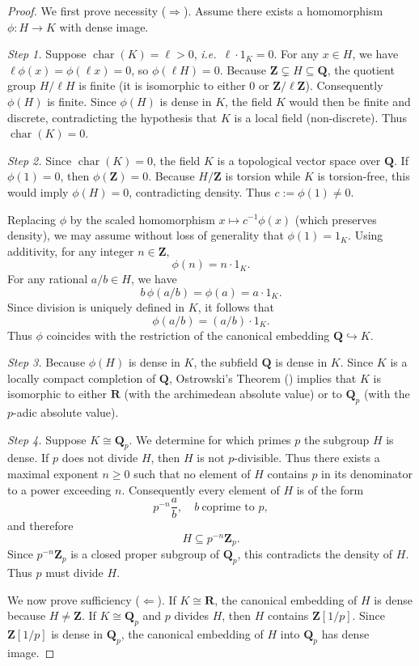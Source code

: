 \documentclass[11pt,a4paper]{article}
\newcommand{\Q}{\mathbf{Q}}
\newcommand{\R}{\mathbf{R}}
\newcommand{\Z}{\mathbf{Z}}
\def\ie{{\it i.e.\/}\ }
\begin{document}
\begin{proof}
We first prove necessity ($\Rightarrow$). 
Assume there exists a homomorphism 
$\phi: H \to K$ with dense image.

\emph{Step 1.}
Suppose $\operatorname{char}(K) = \ell > 0$, 
\ie $\ell\cdot 1_K = 0$. 
For any $x \in H$, we have
$\ell\phi(x)=\phi(\ell x)=0$, 
so $\phi(\ell H)=0$. 
Because $\Z\subsetneq H\subseteq\Q$, 
the quotient group $H/\ell H$ is finite 
(it is isomorphic to either $0$ or $\Z/\ell\Z$). 
Consequently $\phi(H)$ is finite. 
Since $\phi(H)$ is dense in $K$, 
the field $K$ would then be finite and discrete, 
contradicting the hypothesis that $K$ is a 
local field (non-discrete). 
Thus $\operatorname{char}(K)=0$.

\emph{Step 2.}
Since $\operatorname{char}(K)=0$, 
the field $K$ is a topological vector space over $\Q$. 
If $\phi(1)=0$, then $\phi(\Z)=0$. 
Because $H/\Z$ is torsion while $K$ is torsion-free, 
this would imply $\phi(H)=0$, contradicting density. 
Thus $c:=\phi(1)\neq0$. 

Replacing $\phi$ by the scaled homomorphism 
$x\mapsto c^{-1}\phi(x)$ (which preserves density), 
we may assume without loss of generality that 
$\phi(1)=1_K$. 
Using additivity, for any integer $n\in\Z$,
\[
\phi(n)=n\cdot 1_K.
\]
For any rational $a/b\in H$, we have
\[
b\,\phi(a/b)=\phi(a)=a\cdot 1_K.
\]
Since division is uniquely defined in $K$, 
it follows that 
\[
\phi(a/b)=(a/b)\cdot 1_K.
\]
Thus $\phi$ coincides with the restriction 
of the canonical embedding $\Q\hookrightarrow K$.

\emph{Step 3.}
Because $\phi(H)$ is dense in $K$, 
the subfield $\Q$ is dense in $K$. 
Since $K$ is a locally compact completion of $\Q$, 
Ostrowski's Theorem 
(\cite[Theorem~5, Chapter~I, \S3]{Weil}) 
implies that $K$ is isomorphic to either $\R$ 
(with the archimedean absolute value) 
or to $\Q_p$ (with the $p$-adic absolute value).

\emph{Step 4.}
Suppose $K\cong\Q_p$. 
We determine for which primes $p$ 
the subgroup $H$ is dense. 
If $p$ does not divide $H$, then $H$ is not 
$p$-divisible. 
Thus there exists a maximal exponent 
$n\ge0$ such that no element of $H$ 
contains $p$ in its denominator 
to a power exceeding $n$. 
Consequently every element of $H$ 
is of the form
\[
p^{-n}\frac{a}{b},
\quad b\ \text{coprime to }p,
\]
and therefore
\[
H\subseteq p^{-n}\Z_p.
\]
Since $p^{-n}\Z_p$ is a closed proper subgroup 
of $\Q_p$, this contradicts the density of $H$. 
Thus $p$ must divide $H$.\vspace{.02in}

We now prove sufficiency ($\Leftarrow$). 
If $K\cong\R$, the canonical embedding of $H$ 
is dense because $H\neq\Z$. 
If $K\cong\Q_p$ and $p$ divides $H$, 
then $H$ contains $\Z[1/p]$. 
Since $\Z[1/p]$ is dense in $\Q_p$, 
the canonical embedding of $H$ into $\Q_p$ 
has dense image.
\end{proof}
\end{document}
